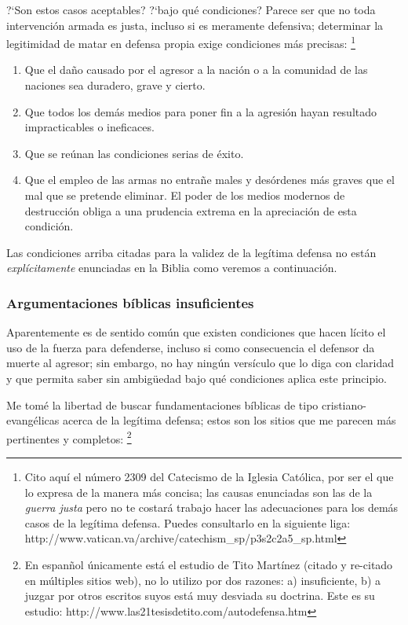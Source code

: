 \documentclass{article}
\begin{document}
?`Son estos casos aceptables? ?`bajo qu\'e condiciones? Parece ser que no toda intervenci\'on armada es justa, incluso si es meramente defensiva; determinar la legitimidad de matar en defensa propia exige condiciones m\'as precisas:%
    \footnote{Cito aqu\'{i} el n\'umero 2309 del Catecismo de la Iglesia Cat\'olica, por ser el que lo expresa de la manera m\'as concisa; las causas enunciadas son las de la \emph{guerra justa} pero no te costar\'a trabajo hacer las adecuaciones para los dem\'as casos de la leg\'{i}tima defensa. Puedes consultarlo en la siguiente liga: http://www.vatican.va/archive/catechism\_sp/p3s2c2a5\_sp.html}

\begin{enumerate}
\item Que el daño causado por el agresor a la nación o a la comunidad de las naciones sea duradero, grave y cierto.
\item Que todos los demás medios para poner fin a la agresión hayan resultado impracticables o ineficaces.
\item Que se reúnan las condiciones serias de éxito.
\item Que el empleo de las armas no entrañe males y desórdenes más graves que el mal que se pretende eliminar. El poder de los medios modernos de destrucción obliga a una prudencia extrema en la apreciación de esta condición.
\end{enumerate}

\noindent
Las condiciones arriba citadas para la validez de la leg\'{i}tima defensa no est\'an \emph{expl\'{i}citamente} enunciadas en la Biblia como veremos a continuaci\'on.

\subsubsection{Argumentaciones b\'{i}blicas insuficientes}

Aparentemente es de sentido com\'un que existen condiciones que hacen l\'{i}cito el uso de la fuerza para defenderse, incluso si como consecuencia el defensor da muerte al agresor; sin embargo, no hay ning\'un vers\'{i}culo que lo diga con claridad y que permita saber sin ambig\"uedad bajo qu\'e condiciones aplica este principio.

Me tom\'e la libertad de buscar fundamentaciones b\'{i}blicas de tipo cristiano-evang\'elicas acerca de la leg\'{i}tima defensa; estos son los sitios que me parecen m\'as pertinentes y completos:%
    \footnote{En espan\~nol \'unicamente est\'a el estudio de Tito Mart\'{i}nez (citado y re-citado en m\'ultiples sitios web), no lo utilizo por dos razones: a) insuficiente, b) a juzgar por otros escritos suyos est\'a muy desviada su doctrina. Este es su estudio: http://www.las21tesisdetito.com/autodefensa.htm}
\end{document}

